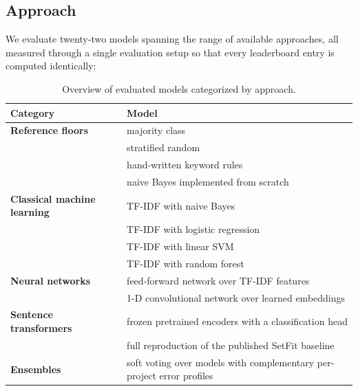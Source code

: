 \subsection{Approach}

We evaluate twenty-two models spanning the range of available approaches, all measured through a single evaluation setup so that every leaderboard entry is computed identically:

\begin{table}[H]
  \centering
  \caption{Overview of evaluated models categorized by approach.}
  \label{tab:model-categories}
  \begin{tabular}{ll}
    \toprule
    \textbf{Category} & \textbf{Model} \\
    \midrule
    \textbf{Reference floors} & majority class \\
    & stratified random \\
    & hand-written keyword rules \\
    & naive Bayes implemented from scratch \\
    \addlinespace
    \textbf{Classical machine learning} & TF-IDF with naive Bayes \\
    & TF-IDF with logistic regression \\
    & TF-IDF with linear SVM \\
    & TF-IDF with random forest \\
    \addlinespace
    \textbf{Neural networks} & feed-forward network over TF-IDF features \\
    & 1-D convolutional network over learned embeddings \\
    \addlinespace
    \textbf{Sentence transformers} & frozen pretrained encoders with a classification head \\
    & full reproduction of the published SetFit baseline \\
    \addlinespace
    \textbf{Ensembles} & soft voting over models with complementary per-project error profiles \\
    \bottomrule
  \end{tabular}
\end{table}

